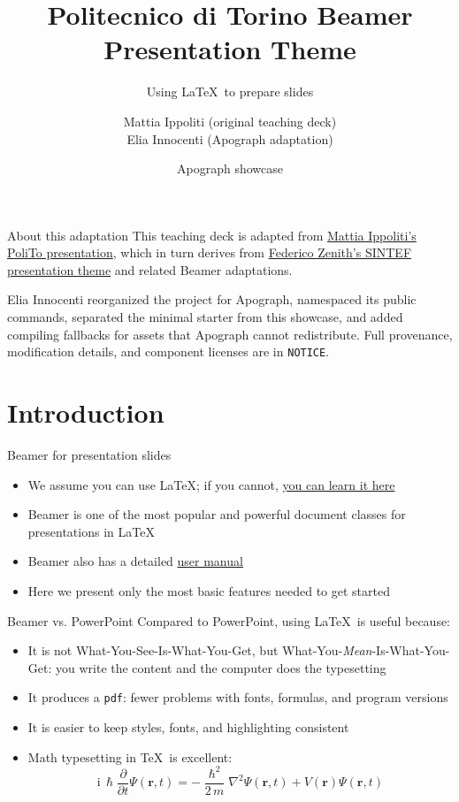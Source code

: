 \documentclass[aspectratio=169]{beamer}
\title{Politecnico di Torino Beamer Presentation Theme}
\subtitle{Using \LaTeX\ to prepare slides}
\author{Mattia Ippoliti (original teaching deck)\\Elia Innocenti (Apograph adaptation)}
\date{Apograph showcase}
\newcommand{\hrefcol}[2]{\textcolor{cyan}{\href{#1}{#2}}}
\begin{document}
\maketitle

\begin{frame}{About this adaptation}
This teaching deck is adapted from
\hrefcol{https://www.overleaf.com/latex/templates/politecnico-di-torino-presentation/cnypkdbdyqky}{Mattia Ippoliti's PoliTo presentation},
which in turn derives from
\hrefcol{https://www.overleaf.com/latex/templates/sintef-presentation/jhbhdffczpnx}{Federico Zenith's SINTEF presentation theme}
and related Beamer adaptations.

\vspace{\baselineskip}

Elia Innocenti reorganized the project for Apograph, namespaced its public
commands, separated the minimal starter from this showcase, and added compiling
fallbacks for assets that Apograph cannot redistribute. Full provenance,
modification details, and component licenses are in \texttt{NOTICE}.
\end{frame}

\section{Introduction}

\begin{frame}{Beamer for presentation slides}
\begin{itemize}
\item We assume you can use \LaTeX; if you cannot,
\hrefcol{https://en.wikibooks.org/wiki/LaTeX/}{you can learn it here}
\item Beamer is one of the most popular and powerful document classes for
presentations in \LaTeX
\item Beamer also has a detailed
\hrefcol{https://ctan.org/pkg/beamer}{user manual}
\item Here we present only the most basic features needed to get started
\end{itemize}
\end{frame}

\begin{frame}{Beamer vs. PowerPoint}
Compared to PowerPoint, using \LaTeX\ is useful because:
\begin{itemize}
\item It is not What-You-See-Is-What-You-Get, but
What-You-\emph{Mean}-Is-What-You-Get: you write the content and the computer
does the typesetting
\item It produces a \texttt{pdf}: fewer problems with fonts, formulas, and
program versions
\item It is easier to keep styles, fonts, and highlighting consistent
\item Math typesetting in \TeX\ is excellent:
\begin{equation*}
\mathrm{i}\,\hslash\frac{\partial}{\partial t}\Psi(\mathbf{r},t)=
-\frac{\hslash^2}{2\,m}\nabla^2\Psi(\mathbf{r},t)
+V(\mathbf{r})\Psi(\mathbf{r},t)
\end{equation*}
\end{itemize}
\end{frame}
\end{document}
